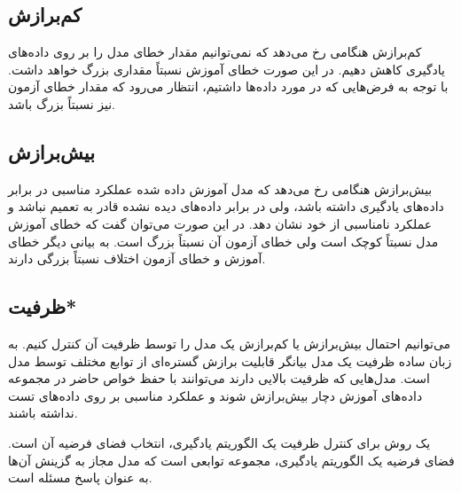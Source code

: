 \subsection{کم‌برازش}

کم‌برازش  هنگامی رخ می‌دهد که نمی‌توانیم مقدار خطای مدل را بر روی داده‌های یادگیری کاهش دهیم. در این صورت خطای آموزش نسبتاً مقداری بزرگ خواهد داشت. با توجه به فرض‌هایی که در مورد داده‌ها داشتیم، انتظار می‌رود که مقدار خطای آزمون نیز نسبتاً بزرگ باشد.

\subsection{بیش‌برازش}

بیش‌برازش هنگامی رخ می‌دهد که مدل آموزش داده شده عملکرد مناسبی در برابر داده‌های یادگیری داشته باشد، ولی در برابر داده‌های دیده نشده قادر به تعمیم نباشد و عملکرد نامناسبی از خود نشان دهد. در این صورت می‌توان گفت که خطای آموزش مدل نسبتاً کوچک است ولی خطای آزمون آن نسبتاً بزرگ است. به بیانی دیگر خطای آموزش و خطای آزمون اختلاف نسبتاً بزرگی دارند.

\subsection{ظرفیت*}

‌می‌توانیم احتمال بیش‌برازش یا کم‌برازش یک مدل را توسط ظرفیت آن کنترل کنیم. به زبان ساده ظرفیت یک مدل بیانگر قابلیت برازش گستره‌ای از توابع مختلف توسط مدل است. مدل‌هایی که ظرفیت بالایی دارند می‌توانند با حفظ خواص حاضر در مجموعه داده‌های آموزش دچار بیش‌برازش شوند و عملکرد مناسبی بر روی داده‌های تست نداشته باشند.

یک روش برای کنترل ظرفیت یک الگوریتم یادگیری، انتخاب فضای فرضیه‌ آن است. فضای فرضیه یک الگوریتم یادگیری، مجموعه توابعی است که مدل مجاز به گزینش آن‌ها به عنوان پاسخ مسئله است.

